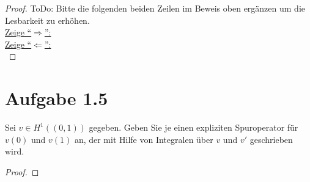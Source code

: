 \documentclass[12pt,a4paper]{article}
\begin{document}
\begin{proof}
ToDo: Bitte die folgenden beiden Zeilen im Beweis oben ergänzen um die Lesbarkeit zu erhöhen.\\
\underline{Zeige ``$\Rightarrow$'':}\\

\underline{Zeige ``$\Leftarrow$'':}\\

\end{proof}

\section*{Aufgabe 1.5}
Sei $v\in H^1((0,1))$ gegeben. Geben Sie je einen expliziten Spuroperator für $v(0)$ und $v(1)$ an, der mit Hilfe von Integralen über $v$ und $v'$ geschrieben wird.

\begin{proof}

\end{proof}
\end{document}

